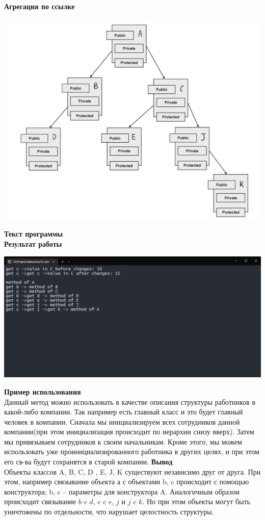 \documentclass[12pt]{report}
\begin{document}
    \textbf{\large{Агрегация по ссылке}}\\
    \begin{center}
        \includegraphics[scale=0.5]{formal/screen_2.png}\\
    \end{center}
    \textbf{Текст программы}\\
    
    \vspace{0.4in}
    \textbf{Результат работы}\\
    \begin{center}
        \includegraphics[scale=0.5]{formal/screen_1.png}\\
    \end{center}
    \textbf{Пример использования}\\
    Данный метод можно использовать в качестве описания структуры работников в какой-либо компании. 
    Так например есть главный класс и это будет главный человек в компании. Сначала мы инициализируем всех сотрудников 
    данной компании(при этом инициализация происходит по иерархии снизу вверх). Затем мы привязываем сотрудников к своим начальникам.
    Кроме этого, мы можем использовать уже проинициализированного работника в других целях, 
    и при этом его св-ва будут сохранятся в старой компании.
    \textbf{Вывод}\\
    Объекты классов A, B, C, D , E, J, K существуют независимо друг от друга. 
    При этом, например связывание объекта а с объектами b, c происходит с помощью конструктора; 
    b, c – параметры для конструктора A.
    Аналогичным образом происходит связывание $b$ c $d$, $c$ c $e$, $j$ и $j$  c $k$. 
    Но при этом объекты могут быть уничтожены по отдельности, что нарушает целостность структуры.
\end{document}
